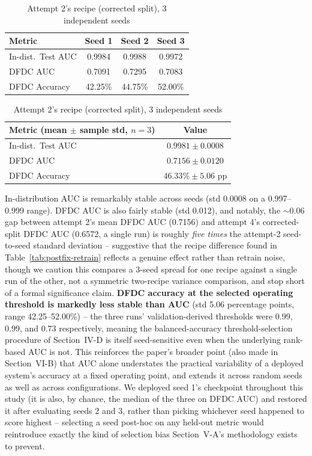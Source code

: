 \documentclass[conference]{IEEEtran}
\begin{document}
\begin{table}[t]
\caption{Attempt 2's recipe (corrected split), 3 independent seeds}
\label{tab:seed-variance}
\centering
\begin{tabular}{@{}lccc@{}}
\toprule
Metric & Seed 1 & Seed 2 & Seed 3 \\
\midrule
In-dist.\ Test AUC & 0.9984 & 0.9988 & 0.9972 \\
DFDC AUC & 0.7091 & 0.7295 & 0.7083 \\
DFDC Accuracy & 42.25\% & 44.75\% & 52.00\% \\
\bottomrule
\end{tabular}

\vspace{4pt}
\begin{tabular}{@{}lc@{}}
\toprule
Metric (mean $\pm$ sample std, $n=3$) & Value \\
\midrule
In-dist.\ Test AUC & $0.9981 \pm 0.0008$ \\
DFDC AUC & $0.7156 \pm 0.0120$ \\
DFDC Accuracy & $46.33\% \pm 5.06$ pp \\
\bottomrule
\end{tabular}
\end{table}

In-distribution AUC is remarkably stable across seeds (std 0.0008 on a
0.997--0.999 range). DFDC AUC is also fairly stable (std 0.012), and
notably, the $\sim$0.06 gap between attempt 2's mean DFDC AUC (0.7156) and
attempt 4's corrected-split DFDC AUC (0.6572, a single run) is roughly
\emph{five times} the attempt-2 seed-to-seed standard deviation --
suggestive that the recipe difference found in
Table~\ref{tab:postfix-retrain} reflects a genuine effect rather than
retrain noise, though we caution this compares a 3-seed spread for one
recipe against a single run of the other, not a symmetric two-recipe
variance comparison, and stop short of a formal significance claim.
\textbf{DFDC accuracy at the selected operating threshold is markedly
less stable than AUC} (std 5.06 percentage points, range 42.25--52.00\%)
-- the three runs' validation-derived thresholds were 0.99, 0.99, and 0.73
respectively, meaning the balanced-accuracy threshold-selection procedure
of Section~IV-D is itself seed-sensitive even when the underlying
rank-based AUC is not. This reinforces the paper's broader point (also
made in Section~VI-B) that AUC alone understates the practical variability
of a deployed system's accuracy at a fixed operating point, and extends it
across random seeds as well as across configurations. We deployed seed 1's
checkpoint throughout this study (it is also, by chance, the median of the
three on DFDC AUC) and restored it after evaluating seeds 2 and 3, rather
than picking whichever seed happened to score highest -- selecting a
seed post-hoc on any held-out metric would reintroduce exactly the kind of
selection bias Section~V-A's methodology exists to prevent.
\end{document}
